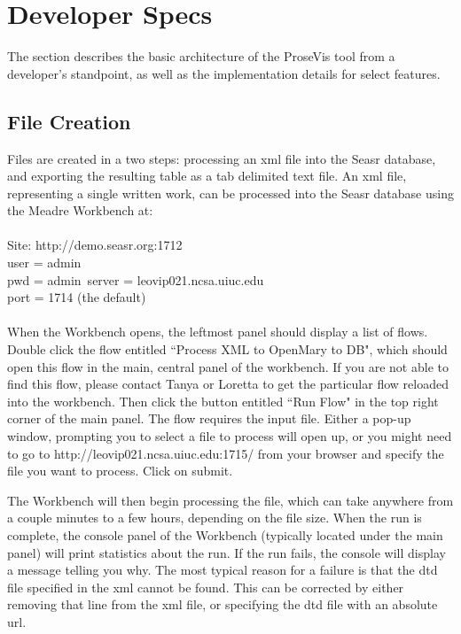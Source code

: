 \documentclass[fleqn]{article}
\begin{document}
\section{Developer Specs}
The section describes the basic architecture of the ProseVis tool from a developer's standpoint, as well as the implementation details for select features.

\subsection{File Creation}
Files are created in a two steps: processing an xml file into the Seasr database, and exporting the resulting table as a tab delimited text file.  An xml file, representing a single written work, can be processed into the Seasr database using the Meadre Workbench at:\\
\\
Site: http://demo.seasr.org:1712\\
user = admin\\
pwd = admin\
server = leovip021.ncsa.uiuc.edu\\
port = 1714 (the default)\\
\\
When the Workbench opens, the leftmost panel should display a list of flows.  Double click the flow entitled ``Process XML to OpenMary to DB", which should open this flow in the main, central panel of the workbench. If you are not able to find this flow, please contact Tanya or Loretta to get the particular flow reloaded into the workbench. Then click the button entitled ``Run Flow" in the top right corner of the main panel. The flow requires the input file. Either a pop-up window, prompting you to select a file to process will open up, or you might need to go to http://leovip021.ncsa.uiuc.edu:1715/ from your browser and specify the file you want to process. Click on submit.

The Workbench will then begin processing the file, which can take anywhere from a couple minutes to a few hours, depending on the file size.  When the run is complete, the console panel of the Workbench (typically located under the main panel) will print statistics about the run.  If the run fails, the console will display a message telling you why.  The most typical reason for a failure is that the dtd file specified in the xml cannot be found.  This can be corrected by either removing that line from the xml file, or specifying the dtd file with an absolute url.
\end{document}
